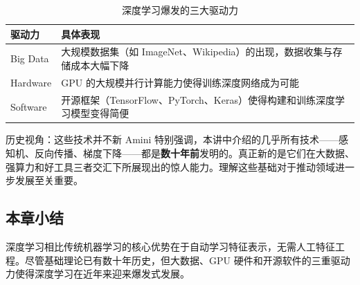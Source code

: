 \begin{table}[H]
\centering
\begin{tabular}{lp{10cm}}
\toprule
\textbf{驱动力} & \textbf{具体表现} \\
\midrule
Big Data & 大规模数据集（如 ImageNet、Wikipedia）的出现，数据收集与存储成本大幅下降 \\
Hardware & GPU 的大规模并行计算能力使得训练深度网络成为可能 \\
Software & 开源框架（TensorFlow、PyTorch、Keras）使得构建和训练深度学习模型变得简便 \\
\bottomrule
\end{tabular}
\caption{深度学习爆发的三大驱动力}
\end{table}

\begin{knowledgebox}{历史视角：这些技术并不新}
Amini 特别强调，本讲中介绍的几乎所有技术——感知机、反向传播、梯度下降——都是\textbf{数十年前}发明的。真正新的是它们在大数据、强算力和好工具三者交汇下所展现出的惊人能力。理解这些基础对于推动领域进一步发展至关重要。
\end{knowledgebox}

\subsection{本章小结}

深度学习相比传统机器学习的核心优势在于自动学习特征表示，无需人工特征工程。尽管基础理论已有数十年历史，但大数据、GPU 硬件和开源软件的三重驱动力使得深度学习在近年来迎来爆发式发展。

